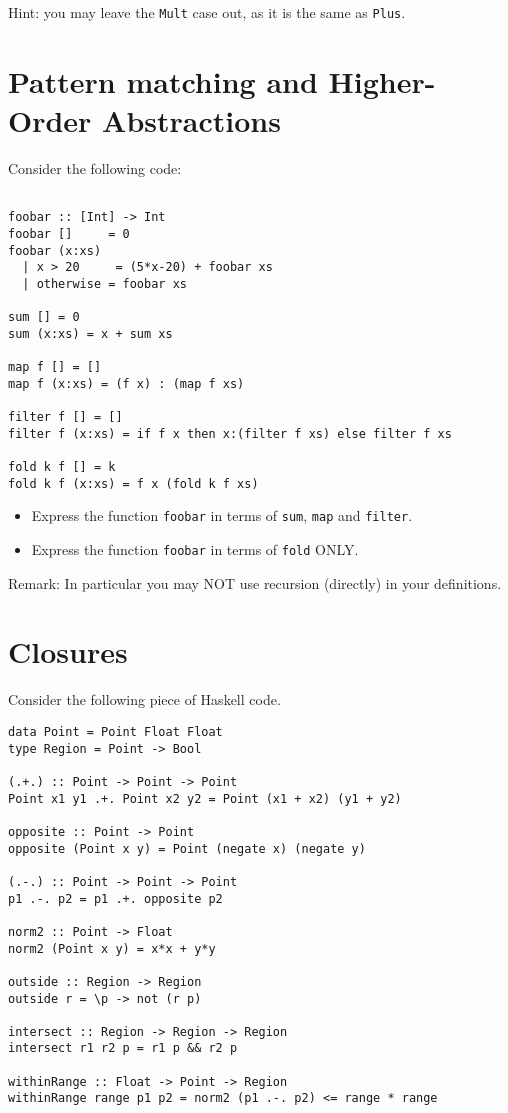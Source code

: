 \documentclass{article}
\newcommand{\answer}[1]{}
\begin{document}
Hint: you may leave the \texttt{Mult} case out, as it is the same as \texttt{Plus}.

\newpage
\section{Pattern matching and Higher-Order Abstractions}

Consider the following code:
\begin{verbatim}

foobar :: [Int] -> Int
foobar []     = 0
foobar (x:xs)
  | x > 20     = (5*x-20) + foobar xs
  | otherwise = foobar xs

sum [] = 0
sum (x:xs) = x + sum xs

map f [] = []
map f (x:xs) = (f x) : (map f xs)

filter f [] = []
filter f (x:xs) = if f x then x:(filter f xs) else filter f xs

fold k f [] = k
fold k f (x:xs) = f x (fold k f xs)
\end{verbatim}

\begin{itemize}
  \item Express the function \texttt{foobar} in terms of \texttt{sum}, \texttt{map} and \texttt{filter}.
  \item Express the function \texttt{foobar} in terms of \texttt{fold} ONLY.
\end{itemize}

Remark: In particular you may NOT use recursion (directly) in your definitions.

\answer{
  \begin{verbatim}
  foobar = sum . map (\x -> 7*x+2) . filter (>3)
  foobar = fold 0 f where
     f x acc = if x > 3 then 7*x + 2 + acc else acc
   \end{verbatim}
}

\newpage
\section{Closures}

Consider the following piece of Haskell code.
\begin{verbatim}
data Point = Point Float Float
type Region = Point -> Bool

(.+.) :: Point -> Point -> Point
Point x1 y1 .+. Point x2 y2 = Point (x1 + x2) (y1 + y2)

opposite :: Point -> Point
opposite (Point x y) = Point (negate x) (negate y)

(.-.) :: Point -> Point -> Point
p1 .-. p2 = p1 .+. opposite p2

norm2 :: Point -> Float
norm2 (Point x y) = x*x + y*y

outside :: Region -> Region
outside r = \p -> not (r p)

intersect :: Region -> Region -> Region
intersect r1 r2 p = r1 p && r2 p

withinRange :: Float -> Point -> Region
withinRange range p1 p2 = norm2 (p1 .-. p2) <= range * range
\end{verbatim}
\end{document}
